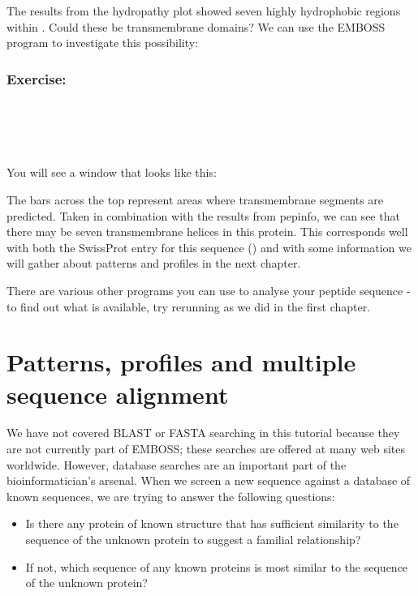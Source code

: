 \documentclass[12pt]{report}
\begin{document}
The results from the  hydropathy plot showed seven
highly hydrophobic regions within . Could these be
transmembrane domains? We can use the EMBOSS program 
to investigate this possibility:

\subsection*{Exercise: }

\unix{}\\
\\
\\
\\

You will see a window that looks like this:

\begin{figure}[H]
\begin{center}
\end{center}
\label{fig:tmap}
\end{figure}

The bars across	the top	represent areas	where transmembrane segments
are predicted. Taken in	combination with the results from pepinfo, we
can see	that there may be seven	transmembrane helices in this
protein. This corresponds well with both the SwissProt entry for this
sequence () and with some information	we will	gather
about patterns and profiles in the next	chapter.

There are various other	programs you can use to	analyse	your peptide
sequence - to find out what is available, try rerunning
	as we did in the first chapter.

\chapter{Patterns, profiles and	multiple sequence alignment}
We have	not covered BLAST or FASTA searching in	this tutorial because
they are not currently part of EMBOSS; these searches are offered at
many web sites worldwide. However, database searches are an important
part of	the bioinformatician's arsenal.	When we	screen a new sequence
against	a database of known sequences, we are trying to	answer the
following questions:

\begin{itemize}
\item Is there any protein of known structure that
has sufficient similarity to the sequence of the unknown protein to
suggest	a familial relationship?
\item If not, which sequence of	any known proteins is most similar
to the sequence	of the unknown protein?
\end{itemize}
\end{document}
